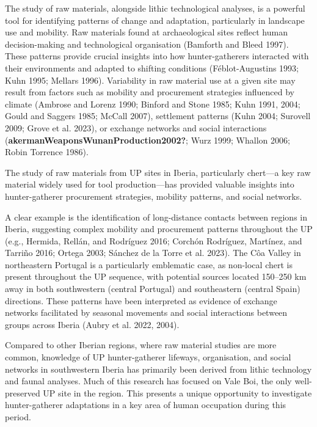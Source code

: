 \documentclass[
  a4paper,
  DIV=11,
  numbers=noendperiod]{scrreprt}
\begin{document}
The study of raw materials, alongside lithic technological analyses, is
a powerful tool for identifying patterns of change and adaptation,
particularly in landscape use and mobility. Raw materials found at
archaeological sites reflect human decision-making and technological
organisation (Bamforth and Bleed 1997). These patterns provide crucial
insights into how hunter-gatherers interacted with their environments
and adapted to shifting conditions (Féblot-Augustins 1993; Kuhn 1995;
Mellars 1996). Variability in raw material use at a given site may
result from factors such as mobility and procurement strategies
influenced by climate (Ambrose and Lorenz 1990; Binford and Stone 1985;
Kuhn 1991, 2004; Gould and Saggers 1985; McCall 2007), settlement
patterns (Kuhn 2004; Surovell 2009; Grove et al. 2023), or exchange
networks and social interactions
(\textbf{akermanWeaponsWunanProduction2002?}; Wurz 1999; Whallon 2006;
Robin Torrence 1986).

The study of raw materials from UP sites in Iberia, particularly
chert---a key raw material widely used for tool production---has
provided valuable insights into hunter-gatherer procurement strategies,
mobility patterns, and social networks.

A clear example is the identification of long-distance contacts between
regions in Iberia, suggesting complex mobility and procurement patterns
throughout the UP (e.g., Hermida, Rellán, and Rodríguez 2016; Corchón
Rodríguez, Martínez, and Tarriño 2016; Ortega 2003; Sánchez de la Torre
et al. 2023). The Côa Valley in northeastern Portugal is a particularly
emblematic case, as non-local chert is present throughout the UP
sequence, with potential sources located 150--250 km away in both
southwestern (central Portugal) and southeastern (central Spain)
directions. These patterns have been interpreted as evidence of exchange
networks facilitated by seasonal movements and social interactions
between groups across Iberia (Aubry et al. 2022, 2004).

Compared to other Iberian regions, where raw material studies are more
common, knowledge of UP hunter-gatherer lifeways, organisation, and
social networks in southwestern Iberia has primarily been derived from
lithic technology and faunal analyses. Much of this research has focused
on Vale Boi, the only well-preserved UP site in the region. This
presents a unique opportunity to investigate hunter-gatherer adaptations
in a key area of human occupation during this period.
\end{document}
